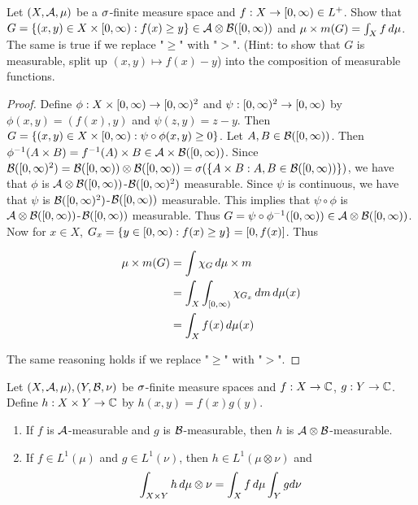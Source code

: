 \documentclass{book}
\begin{document}
	\begin{ex}  
		Let $(X, \mathcal{A}, \mu)$ be a $\sigma$-finite measure space and $f:X \rightarrow [0,\infty) \in L^+$. Show that $G = \{(x,y) \in X \times [0,\infty): f(x) \geq y\} \in \mathcal{A} \otimes \mathcal{B}([0,\infty))$ and $\mu \times m (G) = \int_X f \, d \mu$. The same is true if we replace "$\geq$" with "$>$". (Hint: to show that $G$ is measurable, split up $(x,y) \mapsto f(x) - y$) into the composition of measurable functions. 
	\end{ex}
	
	\begin{proof}
		Define $\phi: X \times [0,\infty) \rightarrow [0,\infty)^2$ and $\psi: [0,\infty)^2 \rightarrow [0,\infty)$ by $\phi(x,y) = (f(x),y)$ and $\psi(z,y) = z-y$. Then $G = \{(x,y) \in X \times [0,\infty): \psi \circ \phi(x,y) \geq 0\}$. Let $A, B \in \mathcal{B}([0,\infty))$. Then $\phi^{-1}(A \times B) = f^{-1}(A) \times B \in \mathcal{A} \times \mathcal{B}([0,\infty))$. Since $\mathcal{B}([0,\infty)^2) = \mathcal{B}([0,\infty)) \otimes \mathcal{B}([0,\infty)) = \sigma(\{A \times B: A, B \in \mathcal{B}([0,\infty))\})$, we have that $\phi$ is $\mathcal{A} \otimes \mathcal{B}([0,\infty))$-$\mathcal{B}([0,\infty)^2)$ measurable. Since $\psi$ is continuous, we have that $\psi$ is $\mathcal{B}([0,\infty)^2)$-$\mathcal{B}([0,\infty))$ measurable. This implies that $\psi \circ \phi$ is $\mathcal{A} \otimes \mathcal{B}([0,\infty))$-$\mathcal{B}([0,\infty))$ measurable. Thus $G = \psi \circ \phi^{-1}([0,\infty)) \in \mathcal{A} \otimes \mathcal{B}([0,\infty))$. Now for $x \in X$, $G_x = \{y \in [0,\infty): f(x) \geq y\} = [0, f(x)]$. Thus 
		
		\begin{align*}
			\mu \times m(G) 
			&= \int \chi_G \, d \mu \times m\\
			&= \int_X \int_{[0,\infty)} \chi_{G_x} \, d m \, d \mu(x)\\
			&= \int_X f(x) \, d \mu(x) 
		\end{align*}
		
		The same reasoning holds if we replace "$\geq$" with "$>$".
	\end{proof}
	
	\begin{ex}  
		Let $(X, \mathcal{A}, \mu), (Y, \mathcal{B}, \nu)$ be $\sigma$-finite measure spaces and $f:X \rightarrow \mathbb{C}$, $g:Y \rightarrow \mathbb{C}$. Define $h:X \times Y \rightarrow \mathbb{C}$ by $h(x,y) = f(x)g(y)$.
		
		\begin{enumerate}
			\item If $f$ is $\mathcal{A}$-measurable and $g$ is $\mathcal{B}$-measurable, then $h$ is $\mathcal{A} \otimes \mathcal{B}$-measurable.
			
			\item If $f \in L^1(\mu)$ and $g \in L^1(\nu)$, then $h \in L^1(\mu \otimes \nu)$ and $$\int_{X \times Y}h\, d \mu \otimes \nu = \int_X f \, d \mu \int_Y g d\nu$$
		\end{enumerate}
	\end{ex}
	
\end{document}
